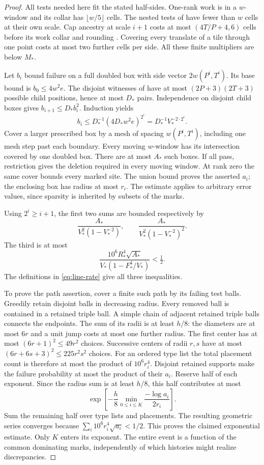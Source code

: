 \begin{proof}
All tests needed here fit the stated half-sides. One-rank work is in
a $w$-window and its collar has $\lfloor w/5\rfloor$ cells. The nested
tests of \cite[Lemma~6.5]{DMline} have fewer than $w$ cells at their
own scale. Cap ancestry at scale $i+1$ costs at most
$(4T/P+4,6)$ cells before its work collar and rounding
\cite[Lemma~6.3]{DMline}. Covering every translate of a tile through
one point costs at most two further cells per side. All these finite
multipliers are below $M_*$.

Let $b_i$ bound failure on a full doubled box with side vector
$2w(P^i,T^i)$. Its base bound is $b_0\le4w^2e$.
The disjoint witnesses of \cite[Lemma~4.2]{DMline} have at most
$(2P+3)(2T+3)$ possible child positions, hence at most $D_*$ pairs.
Independence on disjoint child boxes gives $b_{i+1}\le D_*b_i^2$.
Induction yields
\[
 b_i\le D_*^{-1}(4D_*w^2e)^{2^i}
       =D_*^{-1}V_*^{-2\cdot2^i}.
\]
Cover a larger prescribed box by a mesh of spacing $w(P^i,T^i)$,
including one mesh step past each boundary. Every moving $w$-window
has its intersection covered by one doubled box. There are at most
$A_*$ such boxes. If all pass, restriction gives the deletion required
in every moving window. At rank zero the same cover bounds every
marked site. The union bound proves the asserted $a_i$; the enclosing
box has radius at most $r_i$. The estimate applies to arbitrary error
values, since sparsity is inherited by subsets of the marks.

Using $2^i\ge i+1$, the first two sums are bounded respectively by
\[
 \frac{A_*}{V_*^2(1-V_*^{-2})},\qquad
 \frac{A_*}{V_*^2(1-V_*^{-2})^2}.
\]
The third is at most
\[
 \frac{10^6R_*^4\sqrt{A_*}}{V_*(1-F_*^4/V_*)}<\tfrac12.
\]
The definitions in \eqref{eq:line-rate} give all three inequalities.

To prove the path assertion, cover a finite such path by its failing
test balls. Greedily retain disjoint balls in decreasing radius.
Every removed ball is contained in a retained triple ball. A simple
chain of adjacent retained triple balls connects the endpoints.
The sum of its radii is at least $h/8$: the diameters are at most $6r$
and a unit jump costs at most one further radius.
The first center has at most $(6r+1)^2\le49r^2$ choices.
Successive centers of radii $r,s$ have at most
$(6r+6s+3)^2\le225r^2s^2$ choices. For an ordered type list the total
placement count is therefore at most the product of $10^6r_i^4$.
Disjoint retained supports make the failure probability at most the
product of their $a_i$. Reserve half of each exponent. Since the
radius sum is at least $h/8$, this half contributes at most
\[
 \exp\left[-\frac h8
       \min_{0\le i\le K}\frac{-\log a_i}{2r_i}\right].
\]
Sum the remaining half over type lists and placements. The resulting
geometric series converges because $\sum_i10^6r_i^4\sqrt{a_i}<1/2$.
This proves the claimed exponential estimate. Only $K$ enters its
exponent. The entire event is a function of the common dominating
marks, independently of which histories might realize discrepancies.
\end{proof}

